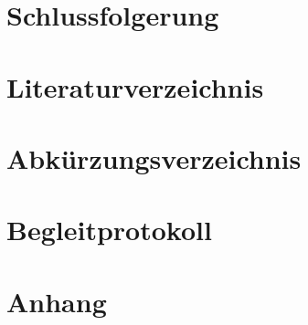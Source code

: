 \chapter{Schlussfolgerung}
\label{chap:con}

\pagebreak

\chapter{Literaturverzeichnis}
\pagebreak

\listoffigures
\pagebreak

\chapter{Abkürzungsverzeichnis}
\pagebreak

\chapter{Begleitprotokoll}

\chapter{Anhang}\Blindtext[2]
